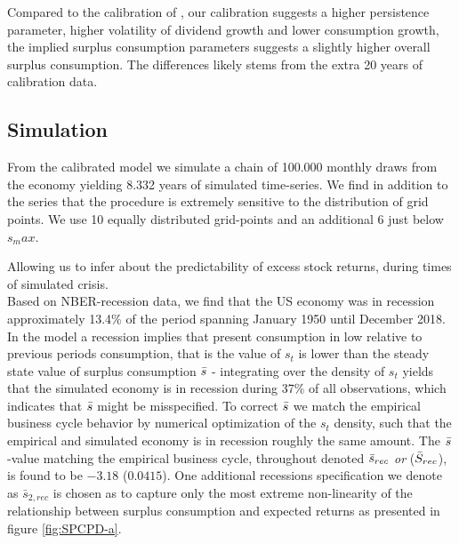 Compared to the calibration of \citet{Campbell1999}, our calibration suggests a higher persistence parameter, higher volatility of dividend growth and lower consumption growth, the implied surplus consumption parameters suggests a slightly higher overall surplus consumption. The differences likely stems from the extra 20 years of calibration data. \\

\subsection{Simulation}
From the calibrated model we simulate a chain of 100.000 monthly draws from the economy yielding 8.332 years of simulated time-series. We find in addition to the series that the procedure is extremely sensitive to the distribution of grid points. We use 10 equally distributed grid-points and an additional 6 just below $s_max$.




Allowing us to infer about the predictability of excess stock returns, during times of simulated crisis. 
\newline
\\
Based on NBER-recession data, we find that the US economy was in recession approximately 13.4\% of the period spanning January 1950 until December 2018.  In the model a recession implies that present consumption in low relative to previous periods consumption, that is the value of $s_t$ is lower than the steady state value of surplus consumption $\Bar{s}$ - integrating over the density of $s_t$ yields that the simulated economy is in recession during 37\% of all observations, which indicates that $\Bar{s}$ might be misspecified. To correct $\Bar{s}$ we match the empirical business cycle behavior by numerical optimization of the $s_t$ density, such that the empirical and simulated economy is in recession roughly the same amount. The $\Bar{s}$-value matching the empirical business cycle, throughout denoted $\Bar{s}_{rec}$ \textit{or} ($\Bar{S}_{rec}$), is found to be $-3.18$ ($0.0415$). One additional recessions specification we denote as $\bar{s}_{2,rec}$ is chosen as to capture only the most extreme non-linearity of the relationship between surplus consumption and expected returns as presented in figure \ref{fig:SPCPD-a}.





